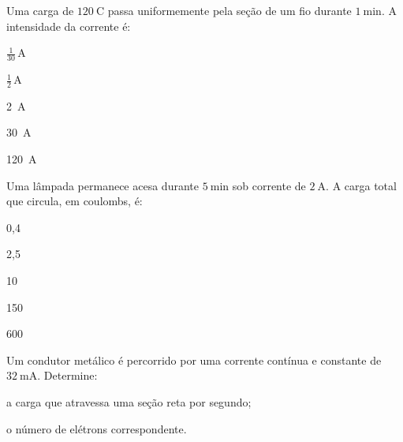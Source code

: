\begin{questao}[1]{}
Uma carga de $\SI{120}{\coulomb}$ passa uniformemente pela seção de um fio durante
$\SI{1}{\minute}$. A intensidade da corrente é:
\begin{alternativas}[3]
\item $\tfrac{1}{30}\,\si{\ampere}$
\item $\tfrac{1}{2}\,\si{\ampere}$
\item \SI{2}{\ampere}
\item \SI{30}{\ampere}
\item \SI{120}{\ampere}
\end{alternativas}
\end{questao}

\begin{questao}[1]{}
Uma lâmpada permanece acesa durante $\SI{5}{\minute}$ sob corrente de
$\SI{2}{\ampere}$. A carga total que circula, em coulombs, é:
\begin{alternativas}[3]
\item 0,4
\item 2,5
\item 10
\item 150
\item 600
\end{alternativas}
\end{questao}

\blocoaplicacao

\begin{questao}[2]{}
Um condutor metálico é percorrido por uma corrente contínua e constante de
$\SI{32}{\milli\ampere}$. Determine:
\begin{itensq}
\item a carga que atravessa uma seção reta por segundo;
\item o número de elétrons correspondente.
\end{itensq}
\end{questao}

